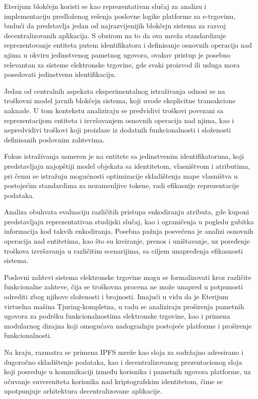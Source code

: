 Eterijum blokčejn koristi se kao reprezentativan slučaj za analizu i implementaciju predloženog rešenja poslovne logike platforme za e-trgovinu, budući da predstavlja jedan od najrazvijenijih blokčejn sistema za razvoj decentralizovanih aplikacija. S obzirom na to da ova mreža standardizuje reprezentovanje entiteta putem identifikatora i definisanje osnovnih operacija nad njima u okviru jedinstvenog pametnog ugovora, ovakav pristup je posebno relevantan za sisteme elektronske trgovine, gde svaki proizvod ili usluga mora posedovati jedinstvenu identifikaciju.

Jedan od centralnih aspekata eksperimentalnog istraživanja odnosi se na troškovni model javnih blokčejn sistema, koji uvode eksplicitne transakcione naknade. U tom kontekstu analiziraju se predvidivi troškovi povezani sa reprezentacijom entiteta i izvršavanjem osnovnih operacija nad njima, kao i nepredvidivi troškovi koji proizlaze iz dodatnih funkcionalnosti i složenosti definisanih poslovnim zahtevima.

Fokus istraživanja usmeren je na entitete sa jedinstvenim identifikatorima, koji predstavljaju najopštiji model objekata sa identitetom, vlasništvom i atributima, pri čemu se istražuju mogućnosti optimizacije skladištenja mape vlasništva u postojećim standardima za nezamenljive tokene, radi efikasnije reprezentacije podataka.

Analiza obuhvata evaluaciju različitih pristupa enkodiranju atributa, gde kuponi predstavljaju reprezentativan studijski slučaj, kao i ograničenja u pogledu gubitka informacija kod takvih enkodiranja. Posebna pažnja posvećena je analizi osnovnih operacija nad entitetima, kao što su kreiranje, prenos i uništavanje, uz poređenje troškova izvršavanja u različitim scenarijima, sa ciljem unapređenja efikasnosti sistema.

Poslovni zahtevi sistema elektronske trgovine mogu se formalizovati kroz različite funkcionalne zahteve, čija se troškovna procena ne može unapred u potpunosti odrediti zbog njihove složenosti i brojnosti. Imajući u vidu da je Eterijum virtuelna mašina Tjuring-kompletna, u radu se analiziraju proširenja pametnih ugovora za podršku funkcionalnostima elektronske trgovine, kao i primena modularnog dizajna koji omogućava nadogradnju postojeće platforme i proširenje funkcionalnosti.

Na kraju, razmatra se primena IPFS mreže kao sloja za sadržajno adresirano i dugoročno skladištenje podataka, kao i decentralizovanog prezentacionog sloja koji posreduje u komunikaciji između korisnika i pametnih ugovora platforme, uz očuvanje suvereniteta korisnika nad kriptografskim identitetom, čime se upotpunjuje arhitektura decentralizovane aplikacije.


